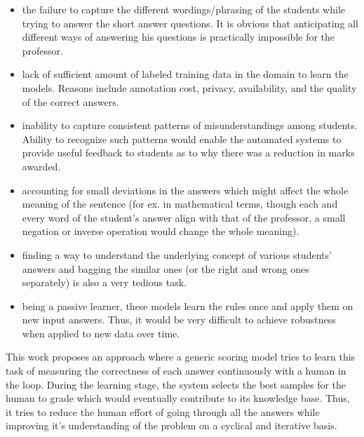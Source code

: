 \documentclass[rnd]{mas_proposal}
\begin{document}
\begin{itemize}

\item the failure to capture the different wordings/phrasing of the students while trying to answer the short answer questions. It is obvious that anticipating all different ways of answering his questions is practically impossible for the professor. 

\item lack of sufficient amount of labeled training data in the domain to learn the models. Reasons include annotation cost, privacy, availability, and the quality of the correct answers. 

\item inability to capture consistent patterns of misunderstandings among students. Ability to recognize such patterns would enable the automated systems to provide useful feedback to students as to why there was a reduction in marks awarded.

\item accounting for small deviations in the answers which might affect the whole meaning of the sentence (for ex. in mathematical terms, though each and every word of the student's answer align with that of the professor, a small negation or inverse operation would change the whole meaning).

\item finding a way to understand the underlying concept of various students' answers and bagging the similar ones (or the right and wrong ones separately) is also a very tedious task. 

\item being a passive learner, these models learn the rules once and apply them on new input answers. Thus, it would be very difficult to achieve robustness when applied to new data over time. \\

\end{itemize}

This work proposes an approach where a generic scoring model tries to learn this task of measuring the correctness of each answer continuously with a human in the loop. During the learning stage, the system selects the best samples for the human to grade which would eventually contribute to its knowledge base. Thus, it tries to reduce the human effort of going through all the answers while improving it's understanding of the problem on a cyclical and iterative basis. \\
\end{document}
